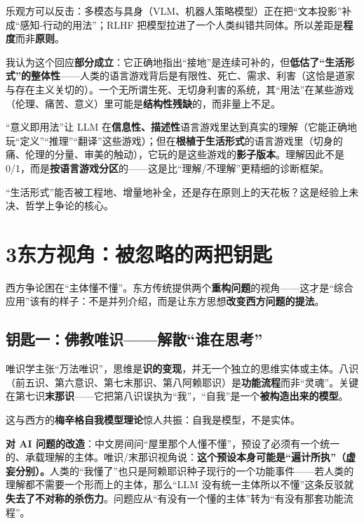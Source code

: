 \documentclass[12pt,a4paper,fontset=none]{ctexart}
\newcommand{\stage}[1]{\par\medskip{\large\hei\bfseries\color{ink}#1}\par\nopagebreak\smallskip}
\begin{document}
\stage{③ 回应}
乐观方可以反击：多模态与具身（VLM、机器人策略模型）正在把“文本投影”补成“感知-行动的用法”；RLHF 把模型拉进了一个人类纠错共同体。所以差距是\textbf{程度}而非\textbf{原则}。

我认为这个回应\textbf{部分成立}：它正确地指出“接地”是连续可补的，但\textbf{低估了“生活形式”的整体性}——人类的语言游戏背后是有限性、死亡、需求、利害（这恰是道家与存在主义关切的）。一个无所谓生死、无切身利害的系统，其“用法”在某些游戏（伦理、痛苦、意义）里可能是\textbf{结构性残缺}的，而非量上不足。

\stage{④ 我的立场}
“意义即用法”让 LLM 在\textbf{信息性、描述性}语言游戏里达到真实的理解（它能正确地玩“定义”“推理”“翻译”这些游戏）；但在\textbf{根植于生活形式}的语言游戏里（切身的痛、伦理的分量、审美的触动），它玩的是这些游戏的\textbf{影子版本}。理解因此不是 0/1，而是\textbf{按语言游戏分区}的——这是比“理解/不理解”更精细的诊断框架。

\stage{⑤ 悬而未决}
“生活形式”能否被工程地、增量地补全，还是存在原则上的天花板？这是经验上未决、哲学上争论的核心。

\section*{3\quad 东方视角：被忽略的两把钥匙}

西方争论困在“主体懂不懂”。东方传统提供两个\textbf{重构问题}的视角——这才是“综合应用”该有的样子：不是并列介绍，而是让东方思想\textbf{改变西方问题的提法}。

\subsection*{\hei\color{ink}钥匙一：佛教唯识——解散“谁在思考”}

唯识学主张“万法唯识”，思维是\textbf{识的变现}，并无一个独立的思维实体或主体。八识（前五识、第六意识、第七末那识、第八阿赖耶识）是\textbf{功能流程}而非“灵魂”。关键在第七识\textbf{末那识}——它把第八识误执为“我”，“自我”是一个\textbf{被构造出来的模型}。

这与西方的\textbf{梅辛格自我模型理论}惊人共振：自我是模型，不是实体。

\textbf{对 AI 问题的改造}：中文房间问“屋里那个人懂不懂”，预设了必须有一个统一的、承载理解的主体。唯识/末那识视角说：\textbf{这个预设本身可能是“遍计所执”（虚妄分别）。}人类的“我懂了”也只是阿赖耶识种子现行的一个功能事件——若人类的理解都不需要一个形而上的主体，那么“LLM 没有统一主体所以不懂”这条反驳就\textbf{失去了不对称的杀伤力}。问题应从“有没有一个懂的主体”转为“有没有那套功能流程”。
\end{document}
